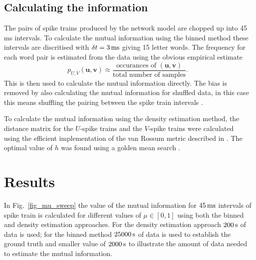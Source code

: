 \documentclass[12pt]{article}
\newcommand{\ms}{\mbox{\,ms}}
\newcommand{\s}{\mbox{\,s}}
\renewcommand{\u}{\mathbf{u}}
\renewcommand{\v}{\mathbf{v}}
\begin{document}
\subsection{Calculating the information}

The pairs of spike trains produced by the network model are chopped up
into 45 ms intervals. To calculate the mutual information using the
binned method these intervals are discritised with $\delta
t=3\ms$ giving 15 letter words. The frequency for each word pair is
estimated from the data using the obvious empirical estimate
\begin{equation}
p_{U,V}(\u,\v)\approx \frac{\mbox{occurances of }(\u,\v)}{\mbox{total number of samples}}.
\end{equation}
This is then used to calculate the mutual information directly. The
bias is removed by also calculating the mutual information for
shuffled data, in this case this means shuffling the pairing between
the spike train intervals \citep{NirenbergEtAl2001,MontemurroEtAl2007,
  PanzeriEtAl2007,MagriEtAl2009}.

To calculate the mutual information using the density estimation
method, the distance matrix for the $U$-spike trains and the $V$-spike
trains were calculated using the efficient implementation of the van
Rossum metric described in \citep{HoughtonKreuz2012}. The optimal
value of $h$ was found using a golden mean search \citep{Kiefer1953}.

\section{Results}

In Fig.~\ref{fig_mu_sweep} the value of the mutual information for
$45\ms$ intervals of spike train is calculated for different values of
$\mu\in[0,1]$ using both the binned and density estimation approaches. For the density estimation
  approach $200\s$ of data is used; for the binned method
  $25000\s$ of data is used to establish the ground truth and smaller
  value of $2000\s$ to illustrate the amount of data needed to
  estimate the mutual information.
\end{document}
